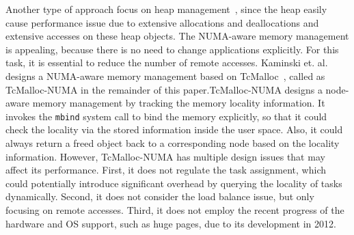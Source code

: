 Another type of approach focus on heap management~\cite{tcmallocnew}, since the heap easily cause performance issue due to extensive allocations and deallocations and extensive accesses on these heap objects. The NUMA-aware memory management is appealing, because there is no need to change applications explicitly. For this task, it is essential to reduce the number of remote accesses. Kaminski et. al. designs a NUMA-aware memory management based on TcMalloc~\cite{tcmallocnew}, called as TcMalloc-NUMA in the remainder of this paper.TcMalloc-NUMA designs a node-aware memory management by tracking the memory locality information. It invokes the \texttt{mbind} system call to bind the memory explicitly, so that it could check the locality via the stored information inside the user space. Also, it could always return a freed object back to a corresponding node based on the locality information. However, TcMalloc-NUMA has multiple design issues that may affect its performance. First, it does not regulate the task assignment, which could potentially introduce significant overhead by querying the locality of tasks dynamically. Second, it does not consider the load balance issue, but only focusing on remote accesses. Third, it does not employ the recent progress of the hardware and OS support, such as huge pages, due to its development in 2012. 


\begin{comment}

It first assumes that a memory block is belong to the same node for its allocating thread. However, this assumption is invalid, and is also contradict with the first-touch policy of the OS. 

If there is no such assumption, we will expect that the OS will provide an efficient API to query the locality of a page. However, no such APIs exist in both Linux and Windows. 

It checks the physical memory usage to determine the future allocations of the same node or the re-use of a remote node. But that is very slow by checking meminfo. 

In the end, it utilizes the mbind to bind the memory to a node specifically. 
	
\end{comment}
	 


